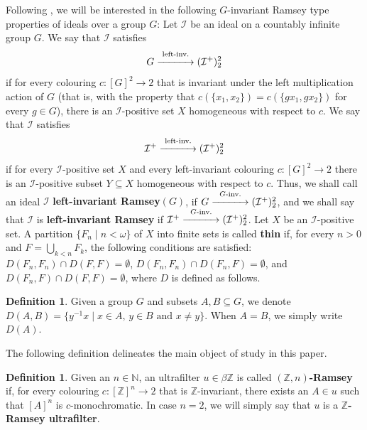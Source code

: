 \documentclass{amsart}
\theoremstyle{definition}
\newtheorem{definition}[theorem]{Definition}
\theoremstyle{remark}
\numberwithin{equation}{section}
\begin{document}
Following \cite{MR3692233}, we will be interested in the following $G$-invariant Ramsey type properties of ideals over a group $G$: Let $\mathcal{I}$ be an ideal on a countably infinite group $G$. We say that $\mathcal{I}$ satisfies
\[
  G \overset{\text{left-inv.}}{\xrightarrow{\hspace{1.1cm}}} (\mathcal{I}^{+})^{2}_{2}
\]
if for every colouring $c \colon [G]^{2} \longrightarrow 2$ that is invariant under the left multiplication action of $G$ (that is, with the property that $c(\{x_{1},x_{2}\})=c(\{gx_{1},gx_{2}\})$ for every $g \in G$), there is an $\mathcal{I}$-positive set $X$ homogeneous with respect to $c$. We say that $\mathcal{I}$ satisfies
\[
  \mathcal{I}^{+} \overset{\text{left-inv.}}{\xrightarrow{\hspace{1.1cm}}} (\mathcal{I}^{+})^{2}_{2}
\]
if for every $\mathcal{I}$-positive set $X$ and every left-invariant colouring $c \colon [G]^{2} \longrightarrow 2$ there is an $\mathcal{I}$-positive subset $Y\subseteq X$ homogeneous with respect to $c$. Thus, we shall call an ideal $\mathcal{I}$ {\bf left-invariant Ramsey$(G)$}, if 
$G \overset{G\text{-inv.}}{\xrightarrow{\hspace{1.1cm}}} (\mathcal{I}^{+})^{2}_{2}$, and we shall say that $\mathcal{I}$ is {\bf left-invariant Ramsey} if $\mathcal{I}^{+} \overset{G\text{-inv.}}{\xrightarrow{\hspace{1.1cm}}} (\mathcal{I}^{+})^{2}_{2}$. Let $X$ be an $\mathcal{I}$-positive set. A partition $\{F_{n} \mid  n < \omega\}$ of $X$ into finite sets is called {\bf thin} if, for every $n > 0$ and $F=\bigcup_{k<n}F_{k}$, the following conditions are satisfied: $D(F_{n},F_{n}) \cap D(F, F) = \emptyset$, $D(F_{n},F_{n}) \cap D(F_{n},F) = \emptyset$, and $D(F_{n}, F) \cap D(F, F) = \emptyset$, where $D$ is defined as follows.

\begin{definition}
    Given a group $G$ and subsets $A,B\subseteq G$, we denote $D(A,B)=\{y^{-1}x \mid x \in A, \, y \in B \text{ and } x \ne y\}$. When $A=B$, we simply write $D(A)$.
\end{definition}

The following definition delineates the main object of study in this paper.

\begin{definition}
Given an $n\in\mathbb N$, an ultrafilter $u\in\beta\mathbb Z$ is called {\bf $(\mathbb Z,n)$-Ramsey} if, for every colouring $c:[\mathbb Z]^n\longrightarrow 2$ that is $\mathbb Z$-invariant, there exists an $A\in u$ such that $[A]^n$ is $c$-monochromatic. In case $n=2$, we will simply say that $u$ is a {\bf $\mathbb Z$-Ramsey ultrafilter}.
\end{definition}
\end{document}
